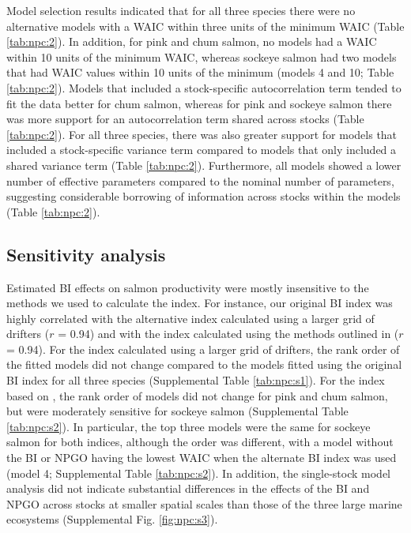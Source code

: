 Model selection results indicated that for all three species there were no
alternative models with a WAIC within three units of the minimum WAIC (Table
\ref{tab:npc:2}). In addition, for pink and chum salmon, no models had a WAIC
within 10 units of the minimum WAIC, whereas sockeye salmon had two models that
had WAIC values within 10 units of the minimum (models 4 and 10; Table
\ref{tab:npc:2}). Models that included a stock-specific autocorrelation term
tended to fit the data better for chum salmon, whereas for pink and sockeye
salmon there was more support for an autocorrelation term shared across stocks
(Table \ref{tab:npc:2}). For all three species, there was also greater support
for models that included a stock-specific variance term compared to models that
only included a shared variance term (Table \ref{tab:npc:2}). Furthermore, all
models showed a lower number of effective parameters compared to the nominal
number of parameters, suggesting considerable borrowing of information across
stocks within the models (Table \ref{tab:npc:2}).


\subsection{Sensitivity analysis}

Estimated BI effects on salmon productivity were mostly insensitive to the
methods we used to calculate the index. For instance, our original BI index was
highly correlated with the alternative index calculated using a larger grid of
drifters (\(r\) = 0.94) and with the index calculated using the methods outlined
in \citet{Watters2008a} (\(r\) = 0.94). For the index calculated using a larger
grid of drifters, the rank order of the fitted models did not change compared to
the models fitted using the original BI index for all three species
(Supplemental Table \ref{tab:npc:s1}). For the index based on
\citet{Watters2008a}, the rank order of models did not change for pink and chum
salmon, but were moderately sensitive for sockeye salmon (Supplemental Table
\ref{tab:npc:s2}). In particular, the top three models were the same for sockeye
salmon for both indices, although the order was different, with a model without
the BI or NPGO having the lowest WAIC when the alternate \citet{Watters2008a} BI
index was used (model 4; Supplemental Table \ref{tab:npc:s2}). In addition, the
single-stock model analysis did not indicate substantial differences in the
effects of the BI and NPGO across stocks at smaller spatial scales than those of
the three large marine ecosystems (Supplemental Fig. \ref{fig:npc:s3}).



